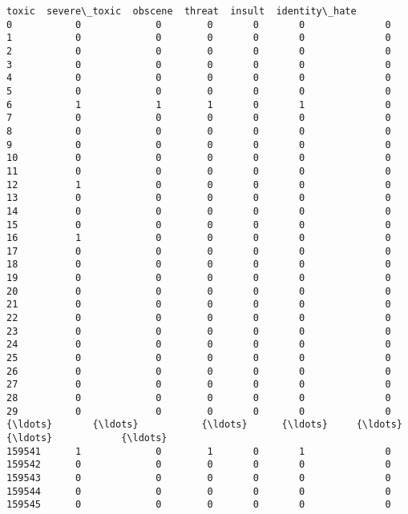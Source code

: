 \documentclass[11pt]{article}
\begin{document}
\begin{Verbatim}[commandchars=\\\{\}]
        toxic  severe\_toxic  obscene  threat  insult  identity\_hate  
0           0             0        0       0       0              0  
1           0             0        0       0       0              0  
2           0             0        0       0       0              0  
3           0             0        0       0       0              0  
4           0             0        0       0       0              0  
5           0             0        0       0       0              0  
6           1             1        1       0       1              0  
7           0             0        0       0       0              0  
8           0             0        0       0       0              0  
9           0             0        0       0       0              0  
10          0             0        0       0       0              0  
11          0             0        0       0       0              0  
12          1             0        0       0       0              0  
13          0             0        0       0       0              0  
14          0             0        0       0       0              0  
15          0             0        0       0       0              0  
16          1             0        0       0       0              0  
17          0             0        0       0       0              0  
18          0             0        0       0       0              0  
19          0             0        0       0       0              0  
20          0             0        0       0       0              0  
21          0             0        0       0       0              0  
22          0             0        0       0       0              0  
23          0             0        0       0       0              0  
24          0             0        0       0       0              0  
25          0             0        0       0       0              0  
26          0             0        0       0       0              0  
27          0             0        0       0       0              0  
28          0             0        0       0       0              0  
29          0             0        0       0       0              0  
{\ldots}       {\ldots}           {\ldots}      {\ldots}     {\ldots}     {\ldots}            {\ldots}  
159541      1             0        1       0       1              0  
159542      0             0        0       0       0              0  
159543      0             0        0       0       0              0  
159544      0             0        0       0       0              0  
159545      0             0        0       0       0              0  

\end{Verbatim}
\end{document}
